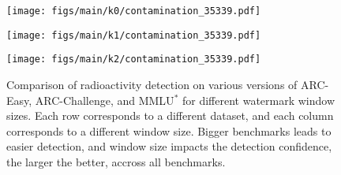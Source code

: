\begin{figure}[t]
\begin{minipage}{0.32\textwidth}
    \end{minipage}
    \vspace{0.5cm} %
    \begin{minipage}{0.32\textwidth}
        \centering
        \texttt{[image: figs/main/k0/contamination\_35339.pdf]}
    \end{minipage}\hfill
    \begin{minipage}{0.32\textwidth}
        \centering
        \texttt{[image: figs/main/k1/contamination\_35339.pdf]}
    \end{minipage}\hfill
    \begin{minipage}{0.32\textwidth}
        \centering
        \texttt{[image: figs/main/k2/contamination\_35339.pdf]}
    \end{minipage}
    \caption{Comparison of radioactivity detection on various versions of ARC-Easy, ARC-Challenge, and MMLU$^*$ for different watermark window sizes.
    Each row corresponds to a different dataset, and each column corresponds to a different window size.
    Bigger benchmarks leads to easier detection, and window size impacts the detection confidence, the larger the better, accross all benchmarks.}
    \label{fig:appendix_watermark_contamination}
\end{figure}





\newpage
\clearpage




